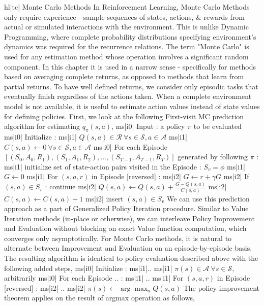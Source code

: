 hl|tc| Monte Carlo Methods
In Reinforcement Learning, Monte Carlo Methods only require experience - sample sequences of states, actions, & rewards from actual or simulated interactions with the environment. This is unlike Dynamic Programming, where complete probability distributions specifying environment's dynamics was required for the recurrence relations. The term "Monte Carlo" is used for any estimation method whose operation involves a significant random component. In this chapter it is used in a narrow sense - specifically for methods based on averaging complete returns, as opposed to methods that learn from partial returns. To have well defined returns, we consider only episodic tasks that eventually finish regardless of the actions taken.
When a complete environment model is not available, it is useful to estimate action values instead of state values for defining policies. First, we look at the following First-visit MC prediction algorithm for estimating \( q_\pi(s, a) \),
ms|i0| Input : a policy \( \pi \) to be evaluated
ms|i0| Initialize :
ms|i1| \( Q(s, a) \in \mathcal{R} \ \forall s \in \mathcal{S}, a \in \mathcal{A} \)
ms|i1| \( C(s, a) \leftarrow 0 \ \forall s \in \mathcal{S}, a \in \mathcal{A} \)
ms|i0| For each Episode \([(S_0, A_0, R_1), (S_1, A_1, R_2),..., (S_{T-1}, A_{T-1}, R_T)] \) generated by following \( \pi \) :
ms|i1| initialize set of state-action pairs visited in the Episode : \( S_v = \phi \)
ms|i1| \( G \leftarrow 0 \)
ms|i1| For \( (s,a,r) \) in Episode [reversed] :
ms|i2| \( G \leftarrow r + \gamma G \)
ms|i2| If \( (s, a) \in S_v \) : continue
ms|i2| \( Q(s,a) \leftarrow Q(s,a) + \frac{G - Q(s, a)}{C(s, a)} \)
ms|i2| \( C(s,a) \leftarrow C(s, a) + 1 \)
ms|i2| insert \( (s,a) \in S_v \)
We can use this prediction approach as a part of Generalized Policy Iteration procedure. Similar to Value Iteration methods (in-place or otherwise), we can interleave Policy Improvement and Evaluation without blocking on exact Value function computation, which converges only asymptotically. For Monte Carlo methods, it is natural to alternate between Improvement and Evaluation on an episode-by-episode basis. The resulting algorithm is identical to policy evaluation described above with the following added steps,
ms|i0| Initialize :
ms|i1|..
ms|i1| \( \pi(s) \in \mathcal{A} \ \forall s \in \mathcal{S}\), arbitrarily
ms|i0| For each Episode .. :
ms|i1| ..
ms|i1| For \( (s, a, r) \) in Episode [reversed] :
ms|i2| ..
ms|i2| \( \pi(s) \leftarrow \arg\max_a Q(s, a) \)
The policy improvement theorem applies on the result of argmax operation as follows,
